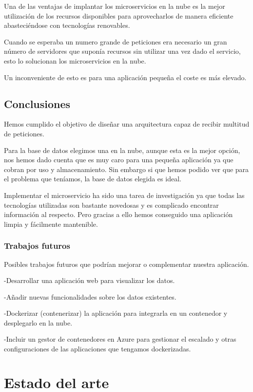 \documentclass[12pt]{report} %
\begin{document}
	Una de las ventajas de implantar los microservicios en la nube es la mejor utilización de los recursos disponibles para aprovecharlos de manera eficiente abasteciéndose con tecnologías renovables.
	
	Cuando se esperaba un numero grande de peticiones era necesario un gran número de servidores que suponía recursos sin utilizar una vez dado el servicio, esto lo solucionan los microservicios en la nube.
	
	Un inconveniente de esto es para una aplicación pequeña el coste es más elevado.
	
	\section{Conclusiones}
	
	Hemos cumplido el objetivo de diseñar una arquitectura capaz de recibir multitud de peticiones.
	
	Para la base de datos elegimos una en la nube, aunque esta es la mejor opción, nos hemos dado cuenta que es muy caro para una pequeña aplicación ya que cobran por uso y almacenamiento. Sin embargo si que hemos podido ver que para el problema que teníamos, la base de datos elegida es ideal.
	
	Implementar el microservicio ha sido una tarea de investigación ya que todas las tecnologías utilizadas son bastante novedosas y es complicado encontrar información al respecto. Pero gracias a ello hemos conseguido una aplicación limpia y fácilmente mantenible.
	
	\subsection{Trabajos futuros}
	
	Posibles trabajos futuros que podrían mejorar o complementar nuestra aplicación.
	
	-Desarrollar una aplicación web para visualizar los datos.
	
	-Añadir nuevas funcionalidades sobre los datos existentes.
	
	-Dockerizar (contenerizar) la aplicación para integrarla en un contenedor y desplegarlo en la nube.
	
	-Incluir un gestor de contenedores en Azure para gestionar el escalado y otras configuraciones de las aplicaciones que tengamos dockerizadas.
	
	\chapter{Estado del arte}
\end{document}
